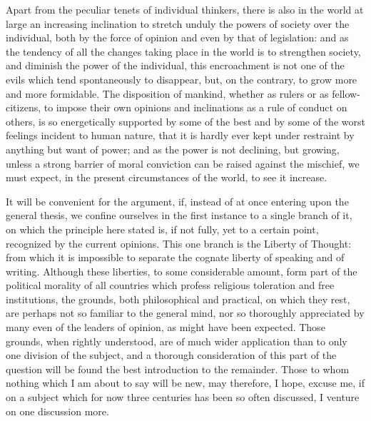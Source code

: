 \documentclass[12pt]{report}
\begin{document}
Apart from the peculiar tenets of individual thinkers, there is also in the world at large an increasing inclination to stretch unduly the powers of society over the individual, both by the force of opinion and even by that of legislation: and as the tendency of all the changes taking place in the world is to strengthen society, and diminish the power of the individual, this encroachment is not one of the evils which tend spontaneously to disappear, but, on the contrary, to grow more and more formidable. The disposition of mankind, whether as rulers or as fellow-citizens, to impose their own opinions and inclinations as a rule of conduct on others, is so energetically supported by some of the best and by some of the worst feelings incident to human nature, that it is hardly ever kept under restraint by anything but want of power; and as the power is not declining, but growing, unless a strong barrier of moral conviction can be raised against the mischief, we must expect, in the present circumstances of the world, to see it increase.

It will be convenient for the argument, if, instead of at once entering upon the general thesis, we confine ourselves in the first instance to a single branch of it, on which the principle here stated is, if not fully, yet to a certain point, recognized by the current opinions. This one branch is the Liberty of Thought: from which it is impossible to separate the cognate liberty of speaking and of writing. Although these liberties, to some considerable amount, form part of the political morality of all countries which profess religious toleration and free institutions, the grounds, both philosophical and practical, on which they rest, are perhaps not so familiar to the general mind, nor so thoroughly appreciated by many even of the leaders of opinion, as might have been expected. Those grounds, when rightly understood, are of much wider application than to only one division of the subject, and a thorough consideration of this part of the question will be found the best introduction to the remainder. Those to whom nothing which I am about to say will be new, may therefore, I hope, excuse me, if on a subject which for now three centuries has been so often discussed, I venture on one discussion more.
\end{document}
